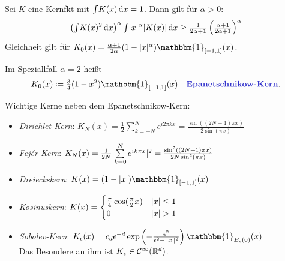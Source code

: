\documentclass{cheat-sheet}
\newcommand{\ind}{\mathbbm{1}} %
\newcommand{\Cont}{\mathcal{C}} %
\begin{document}
\begin{satz}
  Sei $K$ eine Kernfkt mit ${\textstyle \int} K(x) \,\mathrm{d} x = 1$.
  Dann gilt für $\alpha > 0$:
  \[
    \left( {\textstyle \int} K(x)^2 \,\mathrm{d} x \right)^\alpha {\textstyle \int} \lvert x\rvert^\alpha \lvert K(x)\rvert \,\mathrm{d} x \geq \tfrac{1}{2 \alpha + 1} \left( \tfrac{\alpha + 1}{2 \alpha + 1} \right)^\alpha
  \]
  Gleichheit gilt für $K_0(x) = \tfrac{\alpha+1}{2 \alpha} (1 - \abs{x}^\alpha) \ind_{\cinterval{-1}{1}} (x)$.
\end{satz}

\begin{defn}
  Im Speziallfall $\alpha = 2$ heißt
  \[
    K_0(x) \coloneqq \tfrac{3}{4} (1 - x^2) \ind_{\cinterval{-1}{1}} (x) \quad
    \text{\emph{Epanetschnikow-Kern}}.
  \]
\end{defn}


\begin{bem}
  Wichtige Kerne neben dem Epanetschnikow-Kern:
  \begin{itemize}
    \item \emph{Dirichlet-Kern}: \enspace $K_N(x) = \tfrac{1}{2} \sum_{k=-N}^N e^{i 2 \pi k x} = \tfrac{\sin((2 N + 1) \pi x)}{2 \sin (\pi x)}$ %
    \item \emph{Fejér-Kern}: \enspace $K_N(x) = \tfrac{1}{2 N} \abs{\sum_{k=0}^N e^{i k \pi x}}^2 = \tfrac{\sin^2((2 N + 1) \pi x)}{2 N \sin^2(\pi x)}$ %
    \item \emph{Dreieckskern}: \enspace $K(x) = (1 - \abs{x}) \ind_{\cinterval{-1}{1}}(x)$
    \item \emph{Kosinuskern}: \enspace $K(x) = \begin{cases}
      \tfrac{\pi}{4} \cos(\tfrac{\pi}{2} x) & \lvert x\rvert \leq 1 \\
      0 & \lvert x\rvert > 1
    \end{cases}$
    \item \emph{Sobolev-Kern}: \enspace $K_\epsilon(x) = c_d \epsilon^{-d} \exp \left( - \tfrac{\epsilon^2}{\epsilon^2 - \norm{x}^2} \right) \ind_{B_\epsilon(0)}(x)$ \\
    Das Besondere an ihm ist $K_\epsilon \in \Cont^\infty(\R^d)$.
  \end{itemize}
\end{bem}
\end{document}
